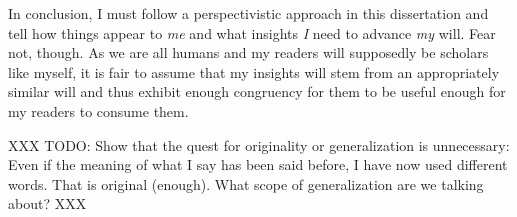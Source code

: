 In conclusion, I must follow a perspectivistic approach in this dissertation and tell how things appear to \textit{me} and what insights \textit{I} need to advance \textit{my} will.
Fear not, though.
As we are all humans and my readers will supposedly be scholars like myself, it is fair to assume that my insights will stem from an appropriately similar will and thus exhibit enough congruency for them to be useful enough for my readers to consume them.

XXX TODO: Show that the quest for originality or generalization is unnecessary: Even if the meaning of what I say has been said before, I have now used different words. That is original (enough). What scope of generalization are we talking about? XXX









